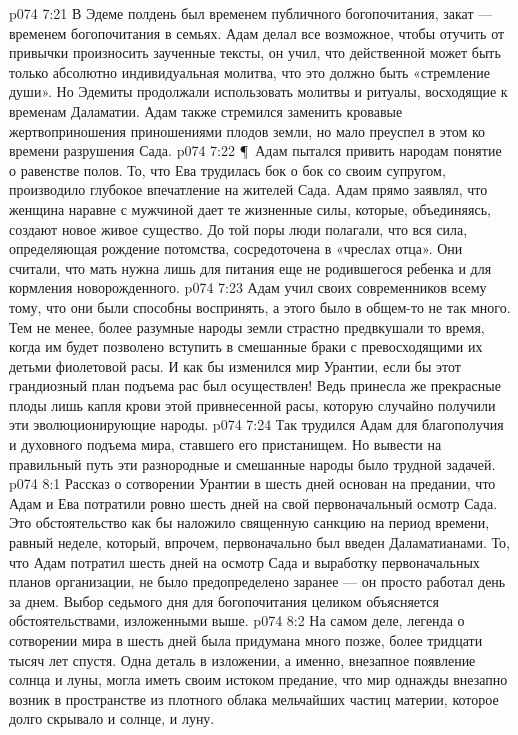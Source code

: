 \vs p074 7:21 В Эдеме полдень был временем публичного богопочитания, закат --- временем богопочитания в семьях. Адам делал все возможное, чтобы отучить от привычки произносить заученные тексты, он учил, что действенной может быть только абсолютно индивидуальная молитва, что это должно быть «стремление души». Но Эдемиты продолжали использовать молитвы и ритуалы, восходящие к временам Даламатии. Адам также стремился заменить кровавые жертвоприношения приношениями плодов земли, но мало преуспел в этом ко времени разрушения Сада.
\vs p074 7:22 \P\ Адам пытался привить народам понятие о равенстве полов. То, что Ева трудилась бок о бок со своим супругом, производило глубокое впечатление на жителей Сада. Адам прямо заявлял, что женщина наравне с мужчиной дает те жизненные силы, которые, объединяясь, создают новое живое существо. До той поры люди полагали, что вся сила, определяющая рождение потомства, сосредоточена в «чреслах отца». Они считали, что мать нужна лишь для питания еще не родившегося ребенка и для кормления новорожденного.
\vs p074 7:23 Адам учил своих современников всему тому, что они были способны воспринять, а этого было в общем\hyp{}то не так много. Тем не менее, более разумные народы земли страстно предвкушали то время, когда им будет позволено вступить в смешанные браки с превосходящими их детьми фиолетовой расы. И как бы изменился мир Урантии, если бы этот грандиозный план подъема рас был осуществлен! Ведь принесла же прекрасные плоды лишь капля крови этой привнесенной расы, которую случайно получили эти эволюционирующие народы.
\vs p074 7:24 Так трудился Адам для благополучия и духовного подъема мира, ставшего его пристанищем. Но вывести на правильный путь эти разнородные и смешанные народы было трудной задачей.
\vs p074 8:1 Рассказ о сотворении Урантии в шесть дней основан на предании, что Адам и Ева потратили ровно шесть дней на свой первоначальный осмотр Сада. Это обстоятельство как бы наложило священную санкцию на период времени, равный неделе, который, впрочем, первоначально был введен Даламатианами. То, что Адам потратил шесть дней на осмотр Сада и выработку первоначальных планов организации, не было предопределено заранее --- он просто работал день за днем. Выбор седьмого дня для богопочитания целиком объясняется обстоятельствами, изложенными выше.
\vs p074 8:2 На самом деле, легенда о сотворении мира в шесть дней была придумана много позже, более тридцати тысяч лет спустя. Одна деталь в изложении, а именно, внезапное появление солнца и луны, могла иметь своим истоком предание, что мир однажды внезапно возник в пространстве из плотного облака мельчайших частиц материи, которое долго скрывало и солнце, и луну.
